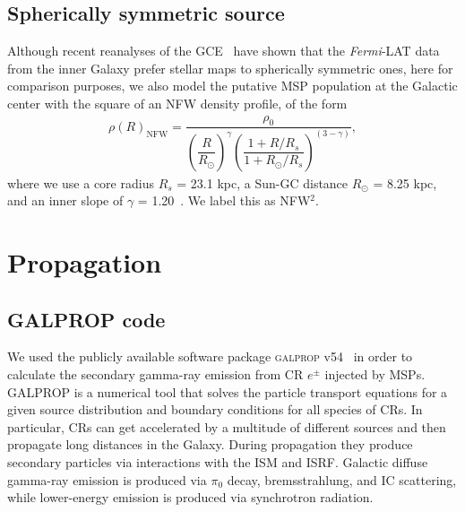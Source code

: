 \documentclass[doublespace,nopageskip]{VTthesis} %
\begin{document}
\subsection{Spherically symmetric source}\label{sec:NFW}

Although recent reanalyses of the GCE~\cite{Macias:2016nev,Bartels:2017vsx} have shown that the \textit{Fermi}-LAT data from the inner Galaxy prefer stellar maps to spherically symmetric ones, here for comparison purposes, we also model the putative MSP population at the Galactic center with the square of an NFW density profile, of the form
\begin{eqnarray}\label{eq:NFW}
  \rho(R)_{\text{NFW}} = \dfrac{\rho_0}{\left(\dfrac{R}{R_\odot}\right)^\gamma\left(\dfrac{1+R/R_s}{1+R_\odot/R_s}\right)^{(3-\gamma)}},
\end{eqnarray}
where we use a core radius $R_s$ = 23.1 kpc, a Sun-GC distance $R_\odot$ = 8.25 kpc, and an inner slope of $\gamma$ = 1.20~\cite{Abazajian:2012pn,Macias:2013vya}. We label this as NFW$^2$.

\section{Propagation}\label{sec:prop}

\subsection{GALPROP code}\label{sec:galprop}

We used the publicly available software package \textsc{galprop} v54~\cite{Galprop,Galpropsupplementary} in order to calculate the secondary gamma-ray emission from CR $e^\pm$ injected by MSPs. GALPROP is a numerical tool that solves the particle transport equations for a given source distribution and boundary conditions for all species of CRs. In particular, CRs can get accelerated by a multitude of different sources and then propagate long distances in the Galaxy. During propagation they produce secondary particles via interactions with the ISM and ISRF. Galactic diffuse gamma-ray emission is produced via $\pi_0$ decay, bremsstrahlung, and IC scattering, while lower-energy emission is produced via synchrotron radiation.
\end{document}
